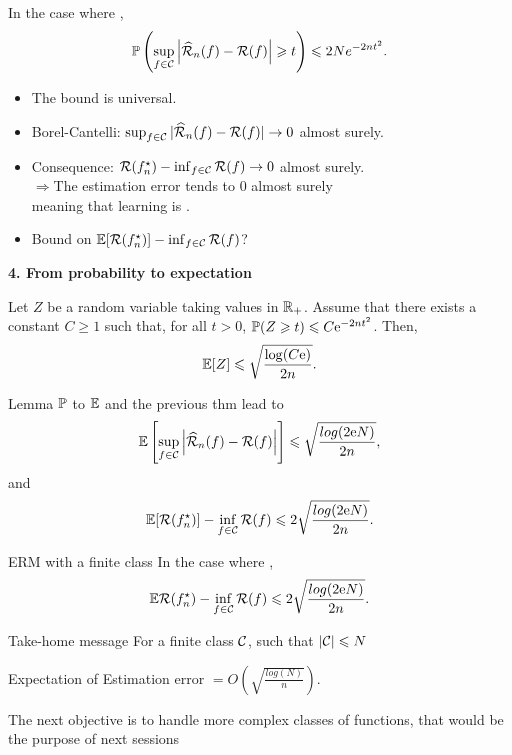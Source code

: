 \documentclass[xcolor={usenames,dvipsnames},handout]{beamer}
\begin{document}
\begin{frame}
In the case where ,
$$
\P \left( \sup_{f\in \Cc} \left| \widehat{\Rc}_n(f) - \Rc(f)  \right| \geq t  \right) \leq 2N e^{-2nt^2}.
$$
\begin{itemize}
\item The bound is universal.
\item Borel-Cantelli: $\sup_{f\in \Cc} |\widehat{\Rc}_n(f) - \Rc(f) | \to 0$ almost surely. 
\item Consequence: $\Rc(f_n^\star) - \inf_{f\in \Cc} \Rc(f)  \to 0$  almost surely. \\
$ \Rightarrow$The estimation error tends to 0 almost surely\\
 meaning that learning is .
\item Bound on $\E [\Rc (f_n^\star)] - \inf_{f\in \Cc} \Rc(f)$?
\end{itemize}
\end{frame}

\begin{frame}

\textbf{4. From probability to expectation} \hfill \\
\begin{lemma}[$\P$ to $\E$]
\label{lem:PtoE}
Let $Z$ be a random variable taking values in $\R_+$. Assume that there exists a constant $C\geq 1$ such that, for all $t>0$, $\P (Z\geq t) \leq  C \mathrm{e}^{-2nt^2}$.
Then,
$$
\E [Z]\leq  \sqrt{\frac{\log(C\mathrm{e})}{2n}}.
$$
\end{lemma}


Lemma $\P$ to $\E$ and the previous thm lead to
$$
 \E \left[  \sup_{f\in \Cc} \left| \widehat{\Rc}_n(f) - \Rc(f)  \right| \right] \leq \sqrt{\frac{log(2\mathrm{e}N)}{2n}},
$$
and
$$
\E [\Rc( f_n^\star)] - \inf_{f\in\Cc} \Rc (f) \leq 2 \sqrt{\frac{log(2\mathrm{e}N)}{2n}}.
$$
\end{frame}

\begin{frame}{ERM with a finite class}
In the case where ,
$$
\E \Rc( f_n^\star) - \inf_{f\in\Cc} \Rc (f) \leq 2 \sqrt{\frac{log(2\mathrm{e}N)}{2n}}.
$$
\begin{alertblock}{Take-home message}
For a finite class $\Cc$, such that $|\Cc|\leq N$
\begin{center}
Expectation of Estimation error $= O \left(\sqrt{\frac{log(N)}{n}} \right)   $.
\end{center}
\end{alertblock}

The next objective is to handle more complex classes of functions, that would be the purpose of next sessions

\vspace{.2cm}


\end{frame}
\end{document}

